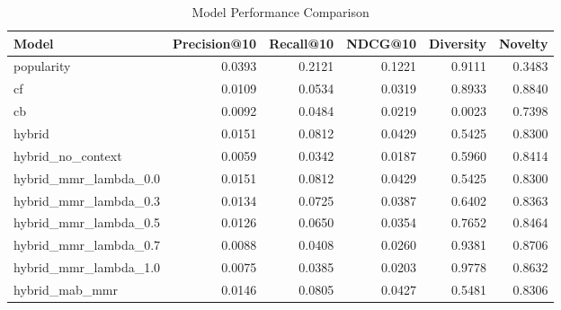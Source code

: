 \begin{table}[htbp]
\centering
\caption{Model Performance Comparison}
\label{tab:model_comparison}
\begin{tabular}{lrrrrr}
\toprule
Model & Precision@10 & Recall@10 & NDCG@10 & Diversity & Novelty \\
\midrule
popularity & 0.0393 & 0.2121 & 0.1221 & 0.9111 & 0.3483 \\
cf & 0.0109 & 0.0534 & 0.0319 & 0.8933 & 0.8840 \\
cb & 0.0092 & 0.0484 & 0.0219 & 0.0023 & 0.7398 \\
hybrid & 0.0151 & 0.0812 & 0.0429 & 0.5425 & 0.8300 \\
hybrid\_no\_context & 0.0059 & 0.0342 & 0.0187 & 0.5960 & 0.8414 \\
hybrid\_mmr\_lambda\_0.0 & 0.0151 & 0.0812 & 0.0429 & 0.5425 & 0.8300 \\
hybrid\_mmr\_lambda\_0.3 & 0.0134 & 0.0725 & 0.0387 & 0.6402 & 0.8363 \\
hybrid\_mmr\_lambda\_0.5 & 0.0126 & 0.0650 & 0.0354 & 0.7652 & 0.8464 \\
hybrid\_mmr\_lambda\_0.7 & 0.0088 & 0.0408 & 0.0260 & 0.9381 & 0.8706 \\
hybrid\_mmr\_lambda\_1.0 & 0.0075 & 0.0385 & 0.0203 & 0.9778 & 0.8632 \\
hybrid\_mab\_mmr & 0.0146 & 0.0805 & 0.0427 & 0.5481 & 0.8306 \\
\bottomrule
\end{tabular}
\end{table}